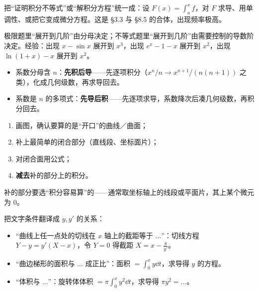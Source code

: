 
把“证明积分不等式”或“解积分方程”统一成：设 $F(x)=\int_a^xf$，对 $F$ 求导、用单调性、或把它变成微分方程。这是 §3.3 与 §8.5 的合体，出现频率极高。


极限题里“展开到几阶”由分母决定；不等式题里“展开到几阶”由需要控制的导数阶决定。经验：出现 $x-\sin x$ 展开到 $x^3$，出现 $e^x-1-x$ 展开到 $x^2$，出现 $\ln(1+x)-x$ 展开到 $x^2$。


\begin{itemize}[leftmargin=1.6em,itemsep=1pt]
\item 系数分母含 $n$：\textbf{先积后导}——先逐项积分（$x^n/n\to x^{n+1}/(n(n+1))$ 之类），化成几何级数，再求导回去。
\item 系数是 $n$ 的多项式：\textbf{先导后积}——先逐项求导，系数降次后凑几何级数，再积分回去。
\end{itemize}


\begin{enumerate}[leftmargin=1.8em,itemsep=1pt]
\item 画图，确认要算的是“开口”的曲线／曲面；
\item 补上最简单的闭合部分（直线段、坐标面片）；
\item 对闭合面用公式；
\item \textbf{减去}补的部分上的积分。
\end{enumerate}
补的部分要选“积分容易算”的——通常取坐标轴上的线段或平面片，其上某个微元为 0。


把文字条件翻译成 $y,y'$ 的关系：
\begin{itemize}[leftmargin=1.6em,itemsep=1pt]
\item “曲线上任一点处的切线在 $x$ 轴上的截距等于 $\ldots$”：切线方程 $Y-y=y'(X-x)$，令 $Y=0$ 得截距 $X=x-\frac{y}{y'}$。
\item “曲边梯形的面积与 $\ldots$ 成正比”：面积 $=\int_0^x y\dd t$，求导得 $y$ 的方程。
\item “体积与 $\ldots$”：旋转体体积 $=\pi\int_0^x y^2\dd t$，求导得 $\pi y^2=\ldots$。
\end{itemize}



